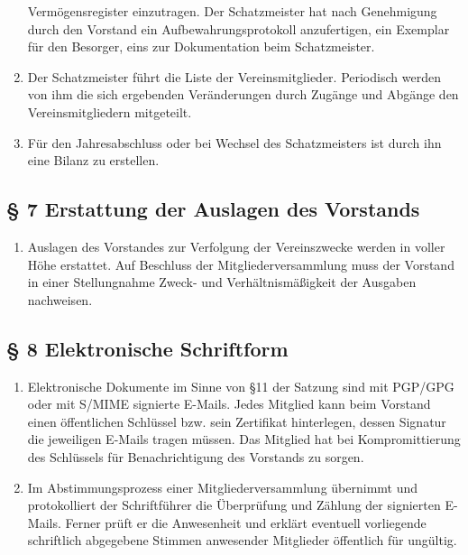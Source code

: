 \documentclass[10pt,a4paper]{article}
\begin{document}
\begin{enumerate}
	Vermögensregister einzutragen. Der Schatzmeister hat nach
	Genehmigung durch den Vorstand ein Aufbewahrungsprotokoll
	anzufertigen, ein Exemplar für den Besorger, eins zur
	Dokumentation beim Schatzmeister.
\item Der Schatzmeister führt die Liste der Vereinsmitglieder.
	Periodisch werden von ihm die sich ergebenden Veränderungen
	durch Zugänge und Abgänge den Vereinsmitgliedern mitgeteilt.
\item Für den Jahresabschluss oder bei Wechsel des Schatzmeisters ist
	durch ihn eine Bilanz zu erstellen. 
\end{enumerate}

\subsection*{§ 7 Erstattung der Auslagen des Vorstands}
\begin{enumerate}
\item Auslagen des Vorstandes zur Verfolgung der Vereinszwecke werden
	in voller Höhe erstattet. Auf Beschluss der Mitgliederversammlung
	muss der Vorstand in einer Stellungnahme Zweck- und Verhältnis\-mäßigkeit
	der Ausgaben nachweisen.
\end{enumerate}

\subsection*{§ 8 Elektronische Schriftform}
\begin{enumerate}
\item Elektronische Dokumente im Sinne von §11 der Satzung sind mit PGP/GPG
	oder mit S/MIME signierte E-Mails. Jedes Mitglied kann beim Vorstand
	einen öffentlichen Schlüssel bzw. sein Zertifikat hinterlegen, dessen
	Signatur die jeweiligen E-Mails tragen müssen. Das Mitglied hat bei
	Kompromittierung des Schlüssels für Benachrichtigung des Vorstands
	zu sorgen.
\item Im Abstimmungsprozess einer Mitgliederversammlung
	übernimmt und protokolliert der Schriftführer die Überprüfung und
	Zählung der signierten E-Mails. Ferner prüft er die Anwesenheit und
	erklärt eventuell vorliegende schriftlich abgegebene Stimmen anwesender
	Mitglieder öffentlich für ungültig.
\end{enumerate}
\end{document}
